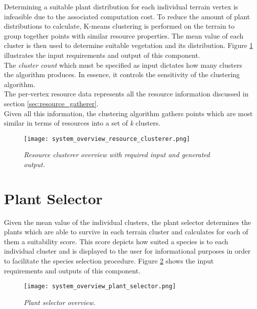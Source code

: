 Determining a suitable plant distribution for each individual terrain vertex is infeasible due to the associated computation cost. To reduce the amount of plant distributions to calculate, K-means clustering is performed on the terrain to group together points with similar resource properties. The mean value of each cluster is then used to determine suitable vegetation and its distribution. Figure \ref{fig:system_overview_resoure_clusterer} illustrates the input requirements and output of this component.\\
The \textit{cluster count} which must be specified as input dictates how many clusters the algorithm produces. In essence, it controls the sensitivity of the clustering algorithm.\\
The per-vertex resource data represents all the resource information discussed in section \ref{sec:resource_gatherer}.\\
Given all this information, the clustering algorithm gathers points which are most similar in terms of resources into a set of \textit{k} clusters. \\

\begin{figure}
\center
	\texttt{[image: system\_overview\_resource\_clusterer.png]}
	\caption{ \textit{Resource clusterer overview with required input and generated output.}}	
	\label{fig:system_overview_resoure_clusterer}
\end{figure}

\section{Plant Selector}

Given the mean value of the individual clusters, the plant selector determines the plants which are able to survive in each terrain cluster and calculates for each of them a suitability score. This score depicts how suited a species is to each individual cluster and is displayed to the user for informational purposes in order to facilitate the species selection procedure. Figure \ref{fig:system_overview_plant_selector} shows the input requirements and outputs of this component.

\begin{figure}
\center
	\texttt{[image: system\_overview\_plant\_selector.png]}
	\caption{ \textit{Plant selector overview.}}	
	\label{fig:system_overview_plant_selector}
\end{figure}

